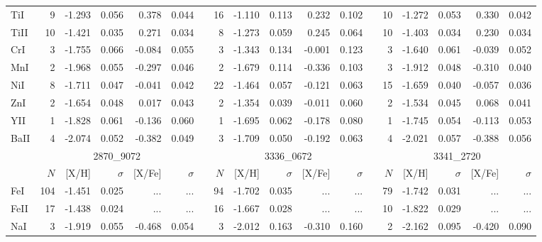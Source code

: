 \documentclass{aa}
\begin{document}
\begin{appendix}
\begin{landscape}
\begin{longtable}{lrrrrrrrrrrrrrrrrr}
TiI  &      9&    -1.293&     0.056&     0.378&     0.044&&     16&    -1.110&     0.113&     0.232&     0.102&&     10&    -1.272&     0.053&     0.330&     0.042\\
TiII &     10&    -1.421&     0.035&     0.271&     0.034&&      8&    -1.273&     0.059&     0.245&     0.064&&     10&    -1.403&     0.034&     0.230&     0.034\\
CrI  &      3&    -1.755&     0.066&    -0.084&     0.055&&      3&    -1.343&     0.134&    -0.001&     0.123&&      3&    -1.640&     0.061&    -0.039&     0.052\\
MnI  &      2&    -1.968&     0.055&    -0.297&     0.046&&      2&    -1.679&     0.114&    -0.336&     0.103&&      3&    -1.912&     0.048&    -0.310&     0.040\\
NiI  &      8&    -1.711&     0.047&    -0.041&     0.042&&     22&    -1.464&     0.057&    -0.121&     0.063&&     15&    -1.659&     0.040&    -0.057&     0.036\\
ZnI  &      2&    -1.654&     0.048&     0.017&     0.043&&      2&    -1.354&     0.039&    -0.011&     0.060&&      2&    -1.534&     0.045&     0.068&     0.041\\
YII  &      1&    -1.828&     0.061&    -0.136&     0.060&&      1&    -1.695&     0.062&    -0.178&     0.080&&      1&    -1.745&     0.054&    -0.113&     0.053\\
BaII &      4&    -2.074&     0.052&    -0.382&     0.049&&      3&    -1.709&     0.050&    -0.192&     0.063&&      4&    -2.021&     0.057&    -0.388&     0.056\\\hline\hline
     &                     \multicolumn{5}{c}{2870\_9072}&&                     \multicolumn{5}{c}{3336\_0672}&&                     \multicolumn{5}{c}{3341\_2720}\\\cline{2-6}\cline{8-12}\cline{14-18}
     & $N$ & [{X}/{H}] & $\sigma$ & [{X}/{Fe}] & $\sigma$&& $N$ & [{X}/{H}] & $\sigma$ & [{X}/{Fe}] & $\sigma$&& $N$ & [{X}/{H}] & $\sigma$ & [{X}/{Fe}] & $\sigma$\\\hline
FeI  &    104&    -1.451&     0.025&       ...&       ...&&     94&    -1.702&     0.035&       ...&       ...&&     79&    -1.742&     0.031&       ...&       ...\\
FeII &     17&    -1.438&     0.024&       ...&       ...&&     16&    -1.667&     0.028&       ...&       ...&&     10&    -1.822&     0.029&       ...&       ...\\
NaI  &      3&    -1.919&     0.055&    -0.468&     0.054&&      3&    -2.012&     0.163&    -0.310&     0.160&&      2&    -2.162&     0.095&    -0.420&     0.090\\

\end{longtable}
\end{landscape}
\end{appendix}
\end{document}
